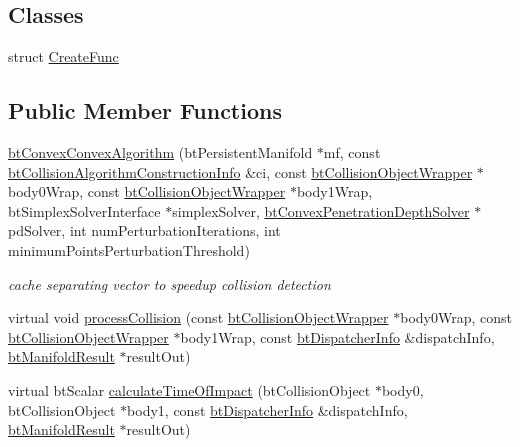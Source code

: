 \subsection*{Classes}
\begin{DoxyCompactItemize}
\item 
struct \hyperlink{structbtConvexConvexAlgorithm_1_1CreateFunc}{Create\+Func}
\end{DoxyCompactItemize}
\subsection*{Public Member Functions}
\begin{DoxyCompactItemize}
\item 
\mbox{\label{classbtConvexConvexAlgorithm_af60334d81e10602a003a0d92ae918af4}} 
\hyperlink{classbtConvexConvexAlgorithm_af60334d81e10602a003a0d92ae918af4}{bt\+Convex\+Convex\+Algorithm} (bt\+Persistent\+Manifold $\ast$mf, const \hyperlink{structbtCollisionAlgorithmConstructionInfo}{bt\+Collision\+Algorithm\+Construction\+Info} \&ci, const \hyperlink{structbtCollisionObjectWrapper}{bt\+Collision\+Object\+Wrapper} $\ast$body0\+Wrap, const \hyperlink{structbtCollisionObjectWrapper}{bt\+Collision\+Object\+Wrapper} $\ast$body1\+Wrap, bt\+Simplex\+Solver\+Interface $\ast$simplex\+Solver, \hyperlink{classbtConvexPenetrationDepthSolver}{bt\+Convex\+Penetration\+Depth\+Solver} $\ast$pd\+Solver, int num\+Perturbation\+Iterations, int minimum\+Points\+Perturbation\+Threshold)
\begin{DoxyCompactList}\small\item\em cache separating vector to speedup collision detection \end{DoxyCompactList}\item 
virtual void \hyperlink{classbtConvexConvexAlgorithm_ab566631355a17f7a4bcbddf9454eb9e5}{process\+Collision} (const \hyperlink{structbtCollisionObjectWrapper}{bt\+Collision\+Object\+Wrapper} $\ast$body0\+Wrap, const \hyperlink{structbtCollisionObjectWrapper}{bt\+Collision\+Object\+Wrapper} $\ast$body1\+Wrap, const \hyperlink{structbtDispatcherInfo}{bt\+Dispatcher\+Info} \&dispatch\+Info, \hyperlink{classbtManifoldResult}{bt\+Manifold\+Result} $\ast$result\+Out)
\item 
virtual bt\+Scalar \hyperlink{classbtConvexConvexAlgorithm_a55f817b690c4e858d2b02607b382ce6b}{calculate\+Time\+Of\+Impact} (bt\+Collision\+Object $\ast$body0, bt\+Collision\+Object $\ast$body1, const \hyperlink{structbtDispatcherInfo}{bt\+Dispatcher\+Info} \&dispatch\+Info, \hyperlink{classbtManifoldResult}{bt\+Manifold\+Result} $\ast$result\+Out)

\end{DoxyCompactItemize}
